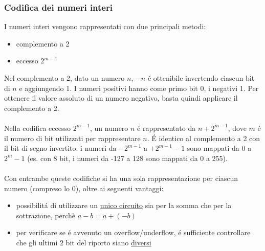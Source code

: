 \documentclass{article}
\begin{document}
\subsubsection{Codifica dei numeri interi}
I numeri interi vengono rappresentati con due principali metodi:
\begin{itemize}
	\item complemento a 2
	\item eccesso $2^{m-1}$
\end{itemize}
Nel complemento a 2, dato un numero $n$, $-n$ é ottenibile invertendo ciascun bit di $n$ e aggiungendo 1. I numeri positivi hanno come primo bit 0, i negativi 1. Per ottenere il valore assoluto di un numero negativo, basta quindi applicare il complemento a 2.\\\\
Nella codifica eccesso $2^{m-1}$, un numero $n$ é rappresentato da $n + 2^{m-1}$, dove $m$ é il numero di bit utilizzati per rappresentare $n$. É identico al complemento a 2 con il bit di segno invertito: i numeri da $-2^{m-1}$ a $+2^{m-1}-1$ sono mappati da $0$ a $2^{m}-1$ (es. con 8 bit, i numeri da -127 a 128 sono mappati da 0 a 255).\\\\
Con entrambe queste codifiche si ha una sola rappresentazione per ciascun numero (compreso lo 0), oltre ai seguenti vantaggi:
\begin{itemize}
	\item possibilitá di utilizzare un \underline{unico circuito} sia per la somma che per la sottrazione, perchè $a-b=a+(-b)$
	\item per verificare se é avvenuto un overflow/underflow, é sufficiente controllare che gli ultimi 2 bit del riporto siano \underline{diversi}
\end{itemize}
\end{document}
